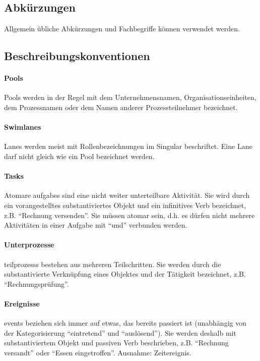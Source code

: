 \documentclass[12pt,report]{../../Templates/snetTeaching}
\begin{document}
\subsection{Abkürzungen}

Allgemein übliche Abkürzungen und Fachbegriffe können verwendet werden.

\subsection{Beschreibungskonventionen}


\paragraph{Pools}
Pools werden in der Regel mit dem Unternehmensnamen, Organisationseinheiten, dem Prozessnamen oder dem Namen anderer Prozessteilnehmer bezeichnet.

\paragraph{Swimlanes}
Lanes werden meist mit Rollenbezeichnungen im Singular beschriftet. Eine Lane darf nicht gleich wie ein Pool bezeichnet werden.

\paragraph{Tasks} Atomare \glspl{aufgabe} sind eine nicht weiter unterteilbare Aktivität. Sie wird durch ein vorangestelltes substantiviertes Objekt und ein infinitives Verb bezeichnet, z.B. "`Rechnung versenden"'. Sie müssen atomar sein, d.h. es dürfen nicht mehrere Aktivitäten in einer Aufgabe mit "`und"' verbunden werden.

\paragraph{Unterprozesse} \glspl{teilprozess} bestehen aus mehreren Teilschritten. Sie werden durch die substantivierte Verknüpfung eines Objektes und der Tätigkeit bezeichnet, z.B. "`Rechnungsprüfung"'.

\paragraph{Ereignisse} \glspl{event} beziehen sich immer auf etwas, das bereits passiert ist (unabhängig von der Kategorisierung "`eintretend"' und "`auslösend"'). Sie werden deshalb mit substantiviertem Objekt und passiven Verb beschrieben, z.B. "`Rechnung versandt"' oder "`Essen eingetroffen"'. Ausnahme: Zeitereignis.
\end{document}
